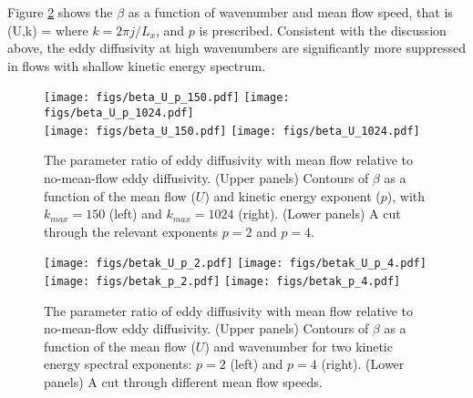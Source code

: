 \documentclass[11pt]{article}
\begin{document}
 Figure \ref{Suppresion2} shows the $\beta$ as a function of wavenumber and mean flow speed, that is
 \beq
\label{betak}
\beta(U,k) =    \com
\eeq
where $k = 2\pi j /L_x $, and $p$ is prescribed. Consistent with the discussion above, the eddy diffusivity at high wavenumbers are significantly more suppressed in flows with shallow kinetic energy spectrum.

 \begin{figure}[ht]
    \centering
    \texttt{[image: figs/beta\_U\_p\_150.pdf]}
    \texttt{[image: figs/beta\_U\_p\_1024.pdf]}\\
       \hspace{-.08\textwidth} \texttt{[image: figs/beta\_U\_150.pdf]}
   \hspace{.03\textwidth}  \texttt{[image: figs/beta\_U\_1024.pdf]}\\
    \caption{\small The parameter ratio of eddy diffusivity with mean flow relative to no-mean-flow eddy diffusivity.
    			  (Upper panels) Contours of $\beta$ as a function of the mean flow ($U$) and kinetic energy exponent ($p$),
			  with $k_{max} = 150$ (left) and $k_{max}=1024$ (right).
			  (Lower panels) A cut through the relevant exponents $p=2$ and $p=4$.}
        \label{Suppresion}
\end{figure}

 \begin{figure}[ht]
    \centering
    \texttt{[image: figs/betak\_U\_p\_2.pdf]}
    \texttt{[image: figs/betak\_U\_p\_4.pdf]}\\
       \hspace{-.08\textwidth} \texttt{[image: figs/betak\_p\_2.pdf]}
   \hspace{.03\textwidth}  \texttt{[image: figs/betak\_p\_4.pdf]}\\
    \caption{\small The parameter ratio of eddy diffusivity with mean flow relative to no-mean-flow eddy diffusivity.
    			  (Upper panels) Contours of $\beta$ as a function of the mean flow ($U$) and wavenumber for two kinetic
			  energy spectral exponents: $p=2$ (left) and $p=4$ (right).
			  (Lower panels) A cut through different mean flow speeds.}
        \label{Suppresion2}
\end{figure}
\end{document}
